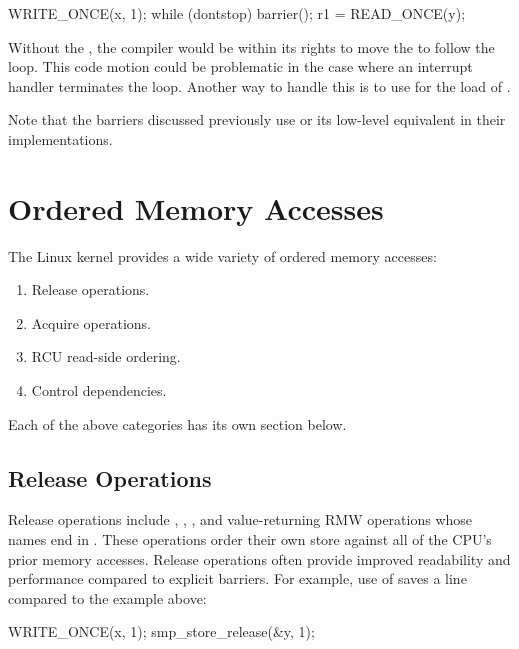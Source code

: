 \begin{VerbatimU}
	WRITE_ONCE(x, 1);
	while (dontstop)
		barrier();
	r1 = READ_ONCE(y);
\end{VerbatimU}

Without the , the compiler would be within its rights to move the
 to follow the loop.
This code motion could be problematic in the case where an interrupt
handler terminates the loop.
Another way to handle this is to use  for the load of
.

Note that the barriers discussed previously use  or its low-level
equivalent in their implementations.


\section{Ordered Memory Accesses}

The Linux kernel provides a wide variety of ordered memory accesses:

\begin{enumerate}
 \item	Release operations.

 \item	Acquire operations.

 \item	RCU read-side ordering.

 \item	Control dependencies.
\end{enumerate}

Each of the above categories has its own section below.


\subsection{Release Operations}

Release operations include , ,
, and value-returning RMW operations whose names
end in .
These operations order their own store against all of the CPU's prior
memory accesses.
Release operations often provide improved readability and performance
compared to explicit barriers.
For example, use of  saves a line compared to the
 example above:

\begin{VerbatimU}
	WRITE_ONCE(x, 1);
	smp_store_release(&y, 1);
\end{VerbatimU}

